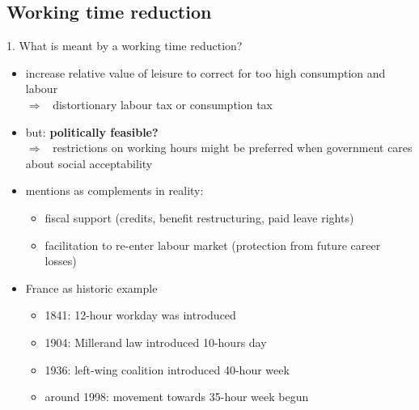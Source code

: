 \documentclass[11pt,aspectratio=169]{beamer}
\newcommand{\ar}{$\Rightarrow$ \ }
\begin{document}
\subsection{Working time reduction}
\begin{frame}{1. What is meant by a working time reduction?}
	\begin{itemize}
		\item increase relative value of leisure to correct for too high consumption and labour\\ \ar distortionary labour tax or consumption tax
		\item but: \textbf{\alert{politically feasible?}} \\ \ar \alert{restrictions on working hours} might be preferred when government cares about social acceptability \citep{Alvarez-Cuadrado2007EnvyHours}
		
	\item \cite{Pullinger2014WorkingDesign} mentions as complements in reality:
	\begin{itemize}
\item fiscal support (credits, benefit restructuring, paid leave rights)
\item  facilitation to re-enter labour market (protection from future career losses)
	\end{itemize}
	\item France as historic example \citep[based on][]{Alvarez-Cuadrado2007EnvyHours}
	\begin{itemize}
		\item 1841: 12-hour workday was introduced
		\item 1904: Millerand law introduced 10-hours day
		\item 1936: left-wing coalition introduced 40-hour week
		\item around 1998: movement towards 35-hour week begun
	\end{itemize}
	\end{itemize}
	
\end{frame}
\end{document}
